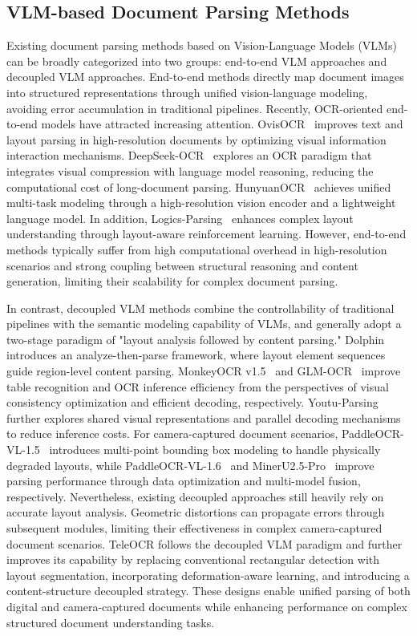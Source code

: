 \documentclass{fairmeta}
\begin{document}
\subsection{VLM-based Document Parsing Methods}
Existing document parsing methods based on Vision-Language Models (VLMs) can be broadly categorized into two groups: end-to-end VLM approaches and decoupled VLM approaches. End-to-end methods directly map document images into structured representations through unified vision-language modeling, avoiding error accumulation in traditional pipelines. Recently, OCR-oriented end-to-end models have attracted increasing attention. OvisOCR~\cite{lu2026ovisocr2} improves text and layout parsing in high-resolution documents by optimizing visual information interaction mechanisms. DeepSeek-OCR~\cite{wei2025deepseek} explores an OCR paradigm that integrates visual compression with language model reasoning, reducing the computational cost of long-document parsing. HunyuanOCR~\cite{hunyuanvisionteam2025hunyuanocrtechnicalreport} achieves unified multi-task modeling through a high-resolution vision encoder and a lightweight language model. In addition, Logics-Parsing~\cite{LogicsParsing} enhances complex layout understanding through layout-aware reinforcement learning. However, end-to-end methods typically suffer from high computational overhead in high-resolution scenarios and strong coupling between structural reasoning and content generation, limiting their scalability for complex document parsing.

In contrast, decoupled VLM methods combine the controllability of traditional pipelines with the semantic modeling capability of VLMs, and generally adopt a two-stage paradigm of "layout analysis followed by content parsing." Dolphin~\cite{feng2025dolphin} introduces an analyze-then-parse framework, where layout element sequences guide region-level content parsing. MonkeyOCR v1.5~\cite{zhang2025monkeyocrv15technicalreport} and GLM-OCR~\cite{glm_ocr} improve table recognition and OCR inference efficiency from the perspectives of visual consistency optimization and efficient decoding, respectively. Youtu-Parsing~\cite{YoutuParsing} further explores shared visual representations and parallel decoding mechanisms to reduce inference costs. For camera-captured document scenarios, PaddleOCR-VL-1.5~\cite{paddleocr_vl15} introduces multi-point bounding box modeling to handle physically degraded layouts, while PaddleOCR-VL-1.6~\cite{zhang2026paddleocr} and MinerU2.5-Pro~\cite{wang2026mineru2} improve parsing performance through data optimization and multi-model fusion, respectively. Nevertheless, existing decoupled approaches still heavily rely on accurate layout analysis. Geometric distortions can propagate errors through subsequent modules, limiting their effectiveness in complex camera-captured document scenarios. TeleOCR follows the decoupled VLM paradigm and further improves its capability by replacing conventional rectangular detection with layout segmentation, incorporating deformation-aware learning, and introducing a content-structure decoupled strategy. These designs enable unified parsing of both digital and camera-captured documents while enhancing performance on complex structured document understanding tasks.
\end{document}
